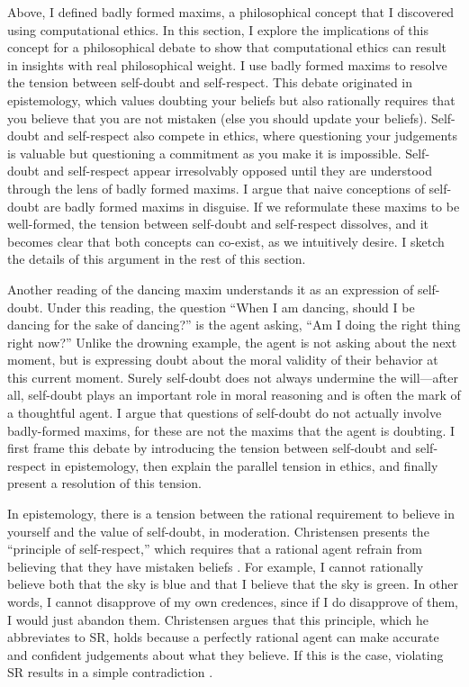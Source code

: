 \begin{isabellebody}
\begin{isamarkuptext}
Above, I defined badly formed maxims, a philosophical concept that I discovered
using computational ethics. In this section, I explore the implications of this concept for a 
philosophical debate to show that computational ethics can result in insights with real 
philosophical weight. I use badly formed maxims to resolve the tension between self-doubt and self-respect. 
This debate originated in epistemology, which values doubting your beliefs but also rationally requires
that you believe that you are not mistaken (else you should update your beliefs). 
Self-doubt and self-respect also compete in ethics, where questioning your judgements is valuable but 
questioning a commitment as you make it is impossible. Self-doubt and self-respect appear 
irresolvably opposed until they are understood through the lens of badly formed maxims. I argue that naive
conceptions of self-doubt are badly formed maxims in disguise. If we reformulate these maxims to be well-formed,
the tension between self-doubt and self-respect dissolves, and it becomes clear that both concepts can
co-exist, as we intuitively desire. I sketch the details of this argument in the rest of this section.

Another reading of the dancing maxim understands it as an expression of self-doubt. Under this 
reading, the question ``When I am dancing, should I be dancing for the sake of dancing?'' is the agent asking, 
``Am I doing the right thing right now?'' Unlike the drowning example, the agent is not asking about the 
next moment, but is expressing doubt about the moral validity of their behavior at this current moment. 
Surely self-doubt does not always undermine the will—after all, self-doubt plays an 
important role in moral reasoning and is often the mark of a thoughtful agent. I argue 
that questions of self-doubt do not actually involve badly-formed maxims, for these are not the maxims 
that the agent is doubting. I first frame this debate by introducing the tension between self-doubt and 
self-respect in epistemology, then explain the parallel tension in ethics, and finally present a 
resolution of this tension.

In epistemology, there is a tension between the rational requirement to believe in yourself and the 
value of self-doubt, in moderation. Christensen presents the ``principle of self-respect,'' which requires 
that a rational agent refrain from believing that they have mistaken beliefs \cite[4]{christensen}. For example, I cannot 
rationally believe both that the sky is blue and that I believe that the sky is green. In other words, I cannot 
disapprove of my own credences, since if I do disapprove of them, I would just abandon them. Christensen 
argues that this principle, which he abbreviates to SR, holds because 
a perfectly rational agent can make accurate and confident judgements about what they believe. If this 
is the case, violating SR results in a simple contradiction \cite[8-9]{christensen}. 


\end{isamarkuptext}
\end{isabellebody}
